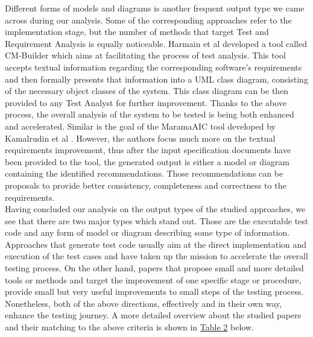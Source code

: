 Different forms of models and diagrams is another frequent output type we came across during our analysis. Some of the corresponding approaches refer to the implementation stage, but the number of methods 
that target Test and Requirement Analysis is equally noticeable. Harmain et al \cite{harmain2000cm} developed a tool called CM-Builder which aims at facilitating the process of test analysis. This tool 
accepts textual information regarding the corresponding software's requirements and then formally presents that information into a UML class diagram, consisting of the necessary object classes of the system. 
This class diagram can be then provided to any Test Analyst for further improvement. Thanks to the above process, the overall analysis of the system to be tested is being both enhanced and accelerated. 
Similar is the goal of the MaramaAIC tool developed by Kamalrudin et al \cite{kamalrudin2017maramaaic}. However, the authors focus much more on the textual requirements improvement, thus after the input 
specification documents have been provided to the tool, the generated output is either a model or diagram containing the identified recommendations. Those recommendations can be proposals to provide better consistency, 
completeness and correctness to the requirements.\\

Having concluded our analysis on the output types of the studied approaches, we see that there are two major types which stand out. Those are the executable test code and any form of model or diagram describing 
some type of information. Approaches that generate test code usually aim at the direct implementation and execution of the test cases and have taken up the mission to accelerate the overall testing process. On the 
other hand, papers that propose small and more detailed tools or methods and target the improvement of one specific stage or procedure, provide small but very useful improvements to small steps of the testing process. 
Nonetheless, both of the above directions, effectively and in their own way, enhance the testing journey. A more detailed overview about the studied papers and their matching to 
the above criteria is shown in \hyperref[table2]{Table 2} below.

